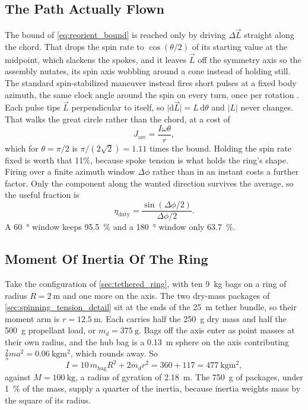 \documentclass{article}
\begin{document}
\subsection*{The Path Actually Flown}
The bound of \autoref{eq:reorient_bound} is reached only by driving \(\Delta\vec{L}\) straight along the chord. That drops the spin rate to \(\cos(\theta/2)\) of its starting value at the midpoint, which slackens the spokes, and it leaves \(\vec{L}\) off the symmetry axis so the assembly nutates, its spin axis wobbling around a cone instead of holding still. The standard spin-stabilized maneuver instead fires short pulses at a fixed body azimuth, the same clock angle around the spin on every turn, once per rotation \cite{wertz1978attitude}. Each pulse tips \(\vec{L}\) perpendicular to itself, so \(\lvert\mathrm{d}\vec{L}\rvert = L\,\mathrm{d}\theta\) and \(\lvert L\rvert\) never changes. That walks the great circle rather than the chord, at a cost of
\begin{equation}
J_{\mathrm{arc}} = \frac{I \omega \theta}{r},
\label{eq:reorient_arc}
\end{equation}
which for \(\theta = \pi/2\) is \(\pi/(2\sqrt{2}) = 1.11\) times the bound. Holding the spin rate fixed is worth that 11\%, because spoke tension is what holds the ring's shape. Firing over a finite azimuth window \(\Delta\phi\) rather than in an instant costs a further factor. Only the component along the wanted direction survives the average, so the useful fraction is
\begin{equation}
\eta_{\mathrm{duty}} = \frac{\sin(\Delta\phi/2)}{\Delta\phi/2}.
\label{eq:reorient_duty}
\end{equation}
A \SI{60}{\degree} window keeps \SI{95.5}{\percent} and a \SI{180}{\degree} window only \SI{63.7}{\percent}.

\subsection*{Moment Of Inertia Of The Ring}
Take the configuration of \autoref{sec:tethered_ring}, with ten \SI{9}{\kilo\gram} bags on a ring of radius \(R = \SI{2}{\meter}\) and one more on the axis. The two dry-mass packages of \autoref{sec:spinning_tension_detail} sit at the ends of the \SI{25}{\meter} tether bundle, so their moment arm is \(r = \SI{12.5}{\meter}\). Each carries half the \SI{250}{\gram} dry mass and half the \SI{500}{\gram} propellant load, or \(m_d = \SI{375}{\gram}\). Bags off the axis enter as point masses at their own radius, and the hub bag is a \SI{0.13}{\meter} sphere on the axis contributing \(\tfrac{2}{5}m a^{2} = \SI{0.06}{\kilo\gram\meter\squared}\), which rounds away. So
\begin{equation}
I = 10\,m_{\mathrm{bag}} R^{2} + 2 m_d r^{2} = 360 + 117 = \SI{477}{\kilo\gram\meter\squared},
\label{eq:reorient_inertia}
\end{equation}
against \(M = \SI{100}{\kilo\gram}\), a radius of gyration of \SI{2.18}{\meter}. The \SI{750}{\gram} of packages, under \SI{1}{\percent} of the mass, supply a quarter of the inertia, because inertia weights mass by the square of its radius.
\end{document}
